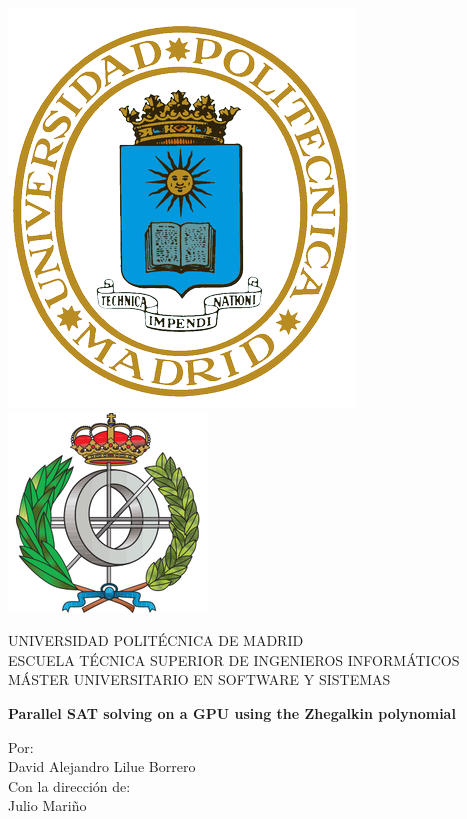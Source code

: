 \begin{titlepage}
    \begin{center}
        \includegraphics[width=0.15\textheight]{logo.png}\hspace{1em}
        \includegraphics[width=0.165\textheight]{ets.png}\\

        \vspace{1em}

        {\large UNIVERSIDAD POLITÉCNICA DE MADRID}\\
        ESCUELA TÉCNICA SUPERIOR DE INGENIEROS INFORMÁTICOS\\
        MÁSTER UNIVERSITARIO EN SOFTWARE Y SISTEMAS

        \vspace{5.5em}

        \textbf{Parallel SAT solving on a GPU using the Zhegalkin polynomial}

        \vspace{5.5em}

        Por:\\
        David Alejandro Lilue Borrero\\
        Con la dirección de:\\
        Julio Mariño\\


\end{center}
\end{titlepage}
